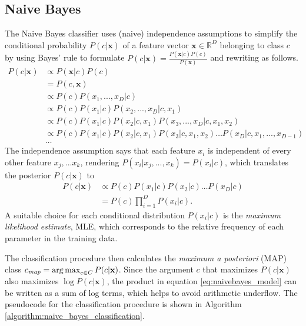 \subsection{Naive Bayes}
The Naive Bayes classifier uses (naive) independence assumptions to simplify the conditional probability $P(c\vert\mathbf{x})$ of a feature vector $\mathbf{x} \in \mathbb{R}^D$ belonging to class $c$ by using Bayes' rule to formulate $P(c\vert \mathbf{x}) = \frac{P(\mathbf{x}\vert c) P(c)}{P(\mathbf{x})}$ and rewriting as follows.
\begin{align*}
P(c\vert \mathbf{x}) &\propto P(\mathbf{x}\vert c)P(c)
\\&=P(c,\mathbf{x})
\\&\propto P(c) P(x_1,...,x_D\vert c)
\\&\propto P(c) P(x_1\vert c) P(x_2,...,x_D\vert c, x_1)
\\&\propto P(c) P(x_1\vert c) P(x_2\vert c, x_1) P(x_3,...,x_D\vert c,x_1,x_2)
\\&\propto P(c) P(x_1\vert c) P(x_2\vert c, x_1) P(x_3\vert c,x_1,x_2) \dots P(x_D\vert c, x_1,...,x_{D-1})
\\&\dots
\end{align*}
The independence assumption says that each feature $x_i$ is independent of every other feature $x_j,...x_k$, rendering $P(x_i\vert x_j,...,x_k) = P(x_i\vert c)$, which translates the posterior $P(c\vert \mathbf{x})$ to
\begin{align}
P(c\vert \mathbf{x}) &\propto P(c) P(x_1\vert c) P(x_2\vert c) \dots P(x_D\vert c) \nonumber
\\&= P(c) \prod_{i=1}^{D} P(x_i\vert c).\label{eq:naivebayes_model}
\end{align}
A suitable choice for each conditional distribution $P(x_i\vert c)$ is the \textit{maximum likelihood estimate}, MLE, which corresponds to the relative frequency of each parameter in the training data.

The classification procedure then calculates the \textit{maximum a posteriori} (MAP) class $c_{\textit{map}} = \operatorname*{arg\,max}_{c\in C} P(c\vert \mathbf{x})$. Since the argument $c$ that maximizes $P(c\vert \mathbf{x})$ also maximizes $\log P(c\vert \mathbf{x})$, the product in equation \ref{eq:naivebayes_model} can be written as a sum of log terms, which helps to avoid arithmetic underflow. The pseudocode for the classification procedure is shown in Algorithm \ref{algorithm:naive_bayes_classification}.

